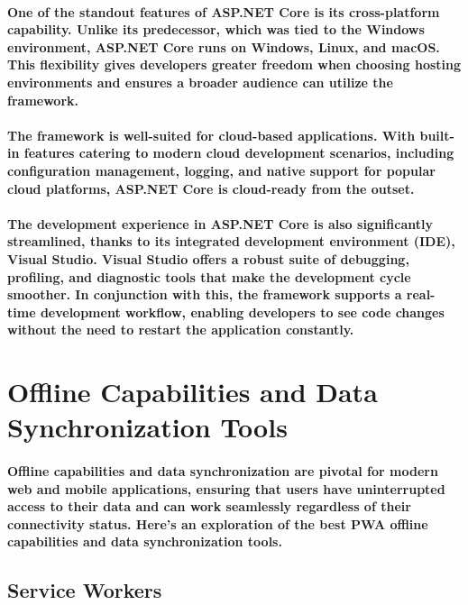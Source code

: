 \documentclass[12pt,a4paper]{article}
\begin{document}
    \paragraph{One of the standout features of ASP.NET Core is its cross-platform capability. Unlike its predecessor, which was tied to the Windows environment, ASP.NET Core runs on Windows, Linux, and macOS. This flexibility gives developers greater freedom when choosing hosting environments and ensures a broader audience can utilize the framework.}
    
    \paragraph{The framework is well-suited for cloud-based applications. With built-in features catering to modern cloud development scenarios, including configuration management, logging, and native support for popular cloud platforms, ASP.NET Core is cloud-ready from the outset.}
    
    \paragraph{The development experience in ASP.NET Core is also significantly streamlined, thanks to its integrated development environment (IDE), Visual Studio. Visual Studio offers a robust suite of debugging, profiling, and diagnostic tools that make the development cycle smoother. In conjunction with this, the framework supports a real-time development workflow, enabling developers to see code changes without the need to restart the application constantly.}

    \section{Offline Capabilities and Data Synchronization Tools}

    \paragraph{Offline capabilities and data synchronization are pivotal for modern web and mobile applications, ensuring that users have uninterrupted access to their data and can work seamlessly regardless of their connectivity status. Here’s an exploration of the best PWA offline capabilities and data synchronization tools.}

    \subsection{Service Workers}
\end{document}
